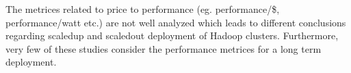 \begin{inparaenum}[\itshape a\upshape)]
\item The metrices related to price to performance (eg. performance/\$, performance/watt etc.) are not well analyzed which leads to different conclusions regarding scaledup and scaledout deployment of Hadoop clusters. 
Furthermore, very few of these studies consider the performance metrices for a long term deployment.
\end{inparaenum}


